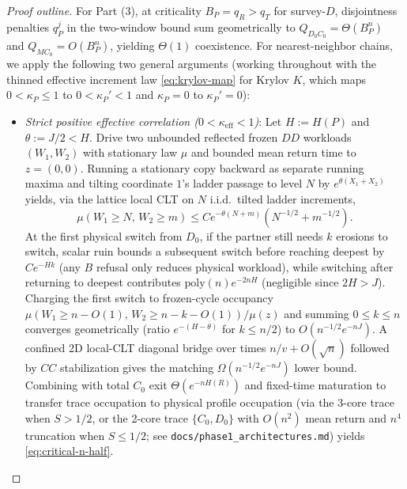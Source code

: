\documentclass[11pt,reqno]{amsart}
\theoremstyle{definition}
\theoremstyle{remark}
\begin{document}
\begin{proof}[Proof outline]
For Part (3), at criticality $B_P = q_R > q_T$ for survey-$D$, disjointness penalties $q_P^j$ in the two-window bound sum geometrically to $Q_{D_0 C_0} = \Theta(B_P^n)$ and $Q_{M C_0} = O(B_P^n)$, yielding $\Theta(1)$ coexistence. For nearest-neighbor chains, we apply the following two general arguments (working throughout with the thinned effective increment law \eqref{eq:krylov-map} for Krylov $K$, which maps $0 < \kappa_P \le 1$ to $0 < \kappa_P' < 1$ and $\kappa_P = 0$ to $\kappa_P' = 0$):
\begin{itemize}
  \item \emph{Strict positive effective correlation ($0 < \kappa_{\mathrm{eff}} < 1$)}: Let $H := H(P)$ and $\theta := J/2 < H$. Drive two unbounded reflected frozen $DD$ workloads $(W_1, W_2)$ with stationary law $\mu$ and bounded mean return time to $z = (0,0)$. Running a stationary copy backward as separate running maxima and tilting coordinate $1$'s ladder passage to level $N$ by $e^{\theta(X_1+X_2)}$ yields, via the lattice local CLT on $N$ i.i.d.\ tilted ladder increments,
  \[
    \mu(W_1 \ge N,\, W_2 \ge m) \le C e^{-\theta(N+m)}(N^{-1/2} + m^{-1/2}).
  \]
  At the first physical switch from $D_0$, if the partner still needs $k$ erosions to switch, scalar ruin bounds a subsequent switch before reaching deepest by $C e^{-Hk}$ (any $B$ refusal only reduces physical workload), while switching after returning to deepest contributes $\mathrm{poly}(n) e^{-2nH}$ (negligible since $2H > J$). Charging the first switch to frozen-cycle occupancy $\mu(W_1 \ge n-O(1),\, W_2 \ge n-k-O(1))/\mu(z)$ and summing $0 \le k \le n$ converges geometrically (ratio $e^{-(H-\theta)}$ for $k \le n/2$) to $O(n^{-1/2} e^{-nJ})$. A confined 2D local-CLT diagonal bridge over times $n/v + O(\sqrt{n})$ followed by $CC$ stabilization gives the matching $\Omega(n^{-1/2} e^{-nJ})$ lower bound. Combining with total $C_0$ exit $\Theta(e^{-nH(R)})$ and fixed-time maturation to transfer trace occupation to physical profile occupation (via the 3-core trace when $S > 1/2$, or the 2-core trace $\{C_0, D_0\}$ with $O(n^2)$ mean return and $n^4$ truncation when $S \le 1/2$; see \texttt{docs/phase1\_architectures.md}) yields \eqref{eq:critical-n-half}.

\end{itemize}
\end{proof}
\end{document}

